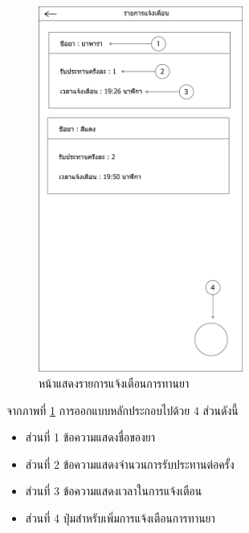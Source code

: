 		\begin{figure}[H]
			\centering
			\includegraphics[width=0.6\textwidth]{Figures/3/UI/notification}
			\caption{หน้าแสดงรายการแจ้งเตือนการทานยา}
			\label{Fig:รายการทานยา}
		\end{figure}
		จากภาพที่ \ref{Fig:รายการทานยา} การออกแบบหลักประกอบไปด้วย 4 ส่วนดังนี้
		\begin{itemize}
			\item ส่วนที่ 1 ข้อความแสดงชื่อของยา
			\item ส่วนที่ 2 ข้อความแสดงจำนวนการรับประทานต่อครั้ง
			\item ส่วนที่ 3 ข้อความแสดงเวลาในการแจ้งเตือน
			\item ส่วนที่ 4 ปุ่มสำหรับเพิ่มการแจ้งเตือนการทานยา
		\end{itemize} \\

